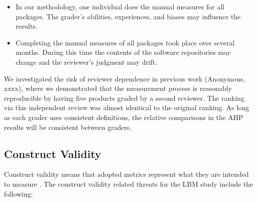 \documentclass[final, 3p, times, authoryear]{elsarticle}
\begin{document}
\begin{itemize}
\item In our methodology, one individual does the manual measures for all
packages. The grader's abilities, experiences, and biases may influence the
results.  
\item Completing the manual measures of all packages took place over several
months. During this time the contents of the software repositories may change
and the reviewer's judgment may drift.
\end{itemize}

We investigated the risk of reviewer dependence in previous work (Anonymous, xxxx)\footnotemark[1],
where we demonstrated that the measurement process is
reasonably reproducible by having five products graded by a second reviewer. The
ranking via this independent review was almost identical to the original
ranking. As long as each grader uses consistent definitions, the relative
comparisons in the AHP results will be consistent between graders.

\subsection{Construct Validity}

Construct validity means that adopted metrics represent what they are intended
to measure \citep{RunesonAndHost2009}. The construct validity related threats
for the LBM study include the following:
\end{document}
